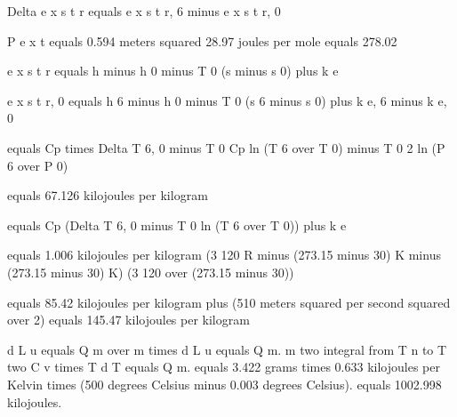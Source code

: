 Delta e x s t r equals e x s t r, 6 minus e x s t r, 0

P e x t equals 0.594 meters squared 
28.97 joules per mole 
equals 278.02

e x s t r equals h minus h 0 minus T 0 (s minus s 0) plus k e

e x s t r, 0 equals h 6 minus h 0 minus T 0 (s 6 minus s 0) plus k e, 6 minus k e, 0

equals Cp times Delta T 6, 0 minus T 0 Cp ln (T 6 over T 0) minus T 0 2 ln (P 6 over P 0)

equals 67.126 kilojoules per kilogram

equals Cp (Delta T 6, 0 minus T 0 ln (T 6 over T 0)) plus k e

equals 1.006 kilojoules per kilogram (3 120 R minus (273.15 minus 30) K minus (273.15 minus 30) K) (3 120 over (273.15 minus 30))

equals 85.42 kilojoules per kilogram plus (510 meters squared per second squared over 2) equals 145.47 kilojoules per kilogram

d L u equals Q m over m times d L u equals Q m.  
m two integral from T n to T two C v times T d T equals Q m.  
equals 3.422 grams times 0.633 kilojoules per Kelvin times (500 degrees Celsius minus 0.003 degrees Celsius).  
equals 1002.998 kilojoules.